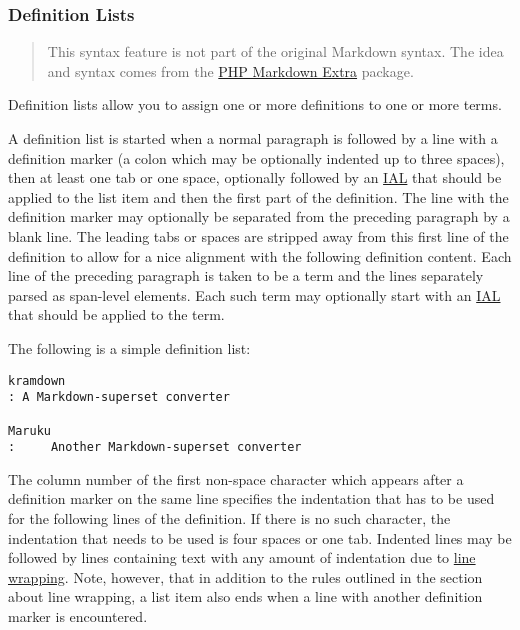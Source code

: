 \documentclass[a4paper]{article}
\begin{document}
\hypertarget{definition-lists}{\subsubsection{Definition
Lists}\label{definition-lists}}

\begin{quote}
This syntax feature is not part of the original Markdown syntax. The
idea and syntax comes from the
\href{http://michelf.com/projects/php-markdown/extra/}{PHP Markdown
Extra} package.
\end{quote}

Definition lists allow you to assign one or more definitions to one or
more terms.

A definition list is started when a normal paragraph is followed by a
line with a definition marker (a colon which may be optionally indented
up to three spaces), then at least one tab or one space, optionally
followed by an \protect\hyperlink{inline-attribute-lists}{IAL} that
should be applied to the list item and then the first part of the
definition. The line with the definition marker may optionally be
separated from the preceding paragraph by a blank line. The leading tabs
or spaces are stripped away from this first line of the definition to
allow for a nice alignment with the following definition content. Each
line of the preceding paragraph is taken to be a term and the lines
separately parsed as span-level elements. Each such term may optionally
start with an \protect\hyperlink{inline-attribute-lists}{IAL} that
should be applied to the term.

The following is a simple definition list:

\begin{verbatim}
kramdown
: A Markdown-superset converter

Maruku
:     Another Markdown-superset converter
\end{verbatim}

The column number of the first non-space character which appears after a
definition marker on the same line specifies the indentation that has to
be used for the following lines of the definition. If there is no such
character, the indentation that needs to be used is four spaces or one
tab. Indented lines may be followed by lines containing text with any
amount of indentation due to \protect\hyperlink{line-wrapping}{line
wrapping}. Note, however, that in addition to the rules outlined in the
section about line wrapping, a list item also ends when a line with
another definition marker is encountered.
\end{document}
